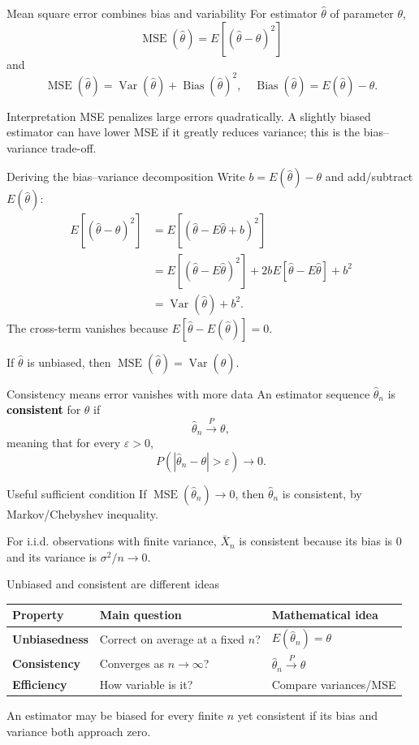 \documentclass[aspectratio=169,11pt]{beamer}
\newcommand{\key}[1]{\textcolor{black}{\textbf{#1}}}
\begin{document}
\begin{frame}{Mean square error combines bias and variability}
For estimator $\hat\theta$ of parameter $\theta$,
\[
\boxed{\operatorname{MSE}(\hat\theta)=E[(\hat\theta-\theta)^2]}
\]
and
\[
\boxed{\operatorname{MSE}(\hat\theta)=\operatorname{Var}(\hat\theta)+\operatorname{Bias}(\hat\theta)^2},
\quad \operatorname{Bias}(\hat\theta)=E(\hat\theta)-\theta.
\]
\begin{block}{Interpretation}
MSE penalizes large errors quadratically. A slightly biased estimator can have lower MSE if it greatly reduces variance; this is the bias--variance trade-off.
\end{block}
\end{frame}

\begin{frame}{Deriving the bias--variance decomposition}
Write $b=E(\hat\theta)-\theta$ and add/subtract $E(\hat\theta)$:
\begin{align*}
E[(\hat\theta-\theta)^2]
&=E[(\hat\theta-E\hat\theta+b)^2]\\
&=E[(\hat\theta-E\hat\theta)^2]
+2bE[\hat\theta-E\hat\theta]+b^2\\
&=\operatorname{Var}(\hat\theta)+b^2.
\end{align*}
The cross-term vanishes because $E[\hat\theta-E(\hat\theta)]=0$.

\medskip
If $\hat\theta$ is unbiased, then $\operatorname{MSE}(\hat\theta)=\operatorname{Var}(\hat\theta)$.
\end{frame}

\begin{frame}{Consistency means error vanishes with more data}
An estimator sequence $\hat\theta_n$ is \key{consistent} for $\theta$ if
\[
\hat\theta_n\xrightarrow{P}\theta,
\]
meaning that for every $\varepsilon>0$,
\[
P(|\hat\theta_n-\theta|>\varepsilon)\longrightarrow0.
\]
\begin{block}{Useful sufficient condition}
If $\operatorname{MSE}(\hat\theta_n)\to0$, then $\hat\theta_n$ is consistent, by Markov/Chebyshev inequality.
\end{block}
For i.i.d. observations with finite variance, $\bar X_n$ is consistent because its bias is 0 and its variance is $\sigma^2/n\to0$.
\end{frame}

\begin{frame}{Unbiased and consistent are different ideas}
\begin{center}
\begin{tabular}{>{\bfseries}p{3cm}p{4.1cm}p{4.1cm}}
\toprule
Property & Main question & Mathematical idea\\
\midrule
Unbiasedness & Correct on average at a fixed $n$? & $E(\hat\theta_n)=\theta$\\
Consistency & Converges as $n\to\infty$? & $\hat\theta_n\xrightarrow{P}\theta$\\
Efficiency & How variable is it? & Compare variances/MSE\\
\bottomrule
\end{tabular}
\end{center}
An estimator may be biased for every finite $n$ yet consistent if its bias and variance both approach zero.
\end{frame}
\end{document}
